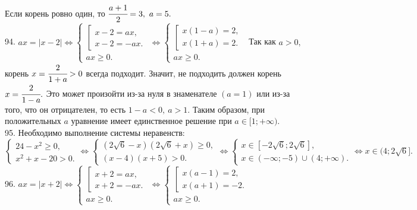 Если корень ровно один, то $\cfrac{a+1}{2}=3,\ a=5.$\\
94. $ax=|x-2|\Leftrightarrow \begin{cases}\left[\begin{array}{l}x-2=ax,\\ x-2=-ax.\end{array}\right.\\ ax\geqslant0.\end{cases}\Leftrightarrow
\begin{cases}\left[\begin{array}{l}x(1-a)=2,\\ x(1+a)=2.\end{array}\right.\\ ax\geqslant0.\end{cases}$
Так как $a>0,$ корень $x=\cfrac{2}{1+a}>0$ всегда подходит. Значит, не подходить должен корень $x=\cfrac{2}{1-a}.$ Это может произойти из-за нуля в знаменателе $(a=1)$ или из-за того, что он отрицателен, то есть $1-a<0,\ a>1.$ Таким образом, при положительных $a$ уравнение имеет единственное решение при $a\in[1;+\infty).$\\
95. Необходимо выполнение системы неравенств:\\ $\begin{cases} 24-x^2\geqslant0,\\ x^2+x-20>0.\end{cases}\Leftrightarrow
\begin{cases} (2\sqrt{6}-x)(2\sqrt{6}+x)\geqslant0,\\ (x-4)(x+5)>0.\end{cases}\Leftrightarrow
\begin{cases} x\in[-2\sqrt{6};2\sqrt{6}],\\ x\in(-\infty;-5)\cup(4;+\infty).\end{cases}\Leftrightarrow x\in(4;2\sqrt{6}].$\\
96. $ax=|x+2|\Leftrightarrow \begin{cases}\left[\begin{array}{l}x+2=ax,\\ x+2=-ax.\end{array}\right.\\ ax\geqslant0.\end{cases}\Leftrightarrow
\begin{cases}\left[\begin{array}{l}x(a-1)=2,\\ x(a+1)=-2.\end{array}\right.\\ ax\geqslant0.\end{cases}$
